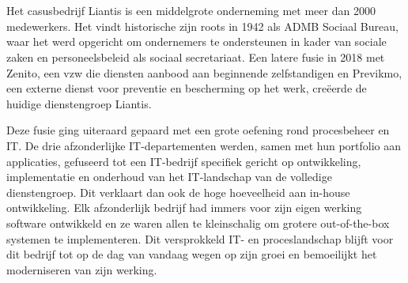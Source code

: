 
\chapter{}%
\label{ch:analyse}
\section{}%
\label{sec:casusbedrijf}
Het casusbedrijf Liantis is een middelgrote onderneming met meer dan 2000 medewerkers. Het vindt historische zijn roots in 1942 als ADMB Sociaal Bureau, waar het werd opgericht om ondernemers te ondersteunen in kader van sociale zaken en personeelsbeleid als sociaal secretariaat. Een latere fusie in 2018 met Zenito, een vzw die diensten aanbood aan beginnende zelfstandigen en Previkmo, een externe dienst voor preventie en bescherming op het werk, creëerde de huidige dienstengroep Liantis.\newline

Deze fusie ging uiteraard gepaard met een grote oefening rond procesbeheer en IT. De drie afzonderlijke IT-departementen werden, samen met hun portfolio aan applicaties, gefuseerd tot een IT-bedrijf specifiek gericht op ontwikkeling, implementatie en onderhoud van het IT-landschap van de volledige dienstengroep. Dit verklaart dan ook de hoge hoeveelheid aan in-house ontwikkeling. Elk afzonderlijk bedrijf had immers voor zijn eigen werking software ontwikkeld en ze waren allen te kleinschalig om grotere out-of-the-box systemen te implementeren. Dit versprokkeld IT- en proceslandschap blijft voor dit bedrijf tot op de dag van vandaag wegen op zijn groei en bemoeilijkt het moderniseren van zijn werking.
\section{}%
\label{sec:functionele vereisten}
